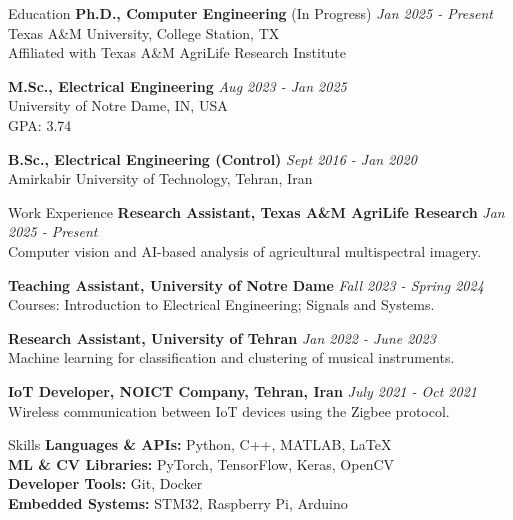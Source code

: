 \documentclass{resume} %
\begin{document}
\begin{rSection}{Education}
{\bf Ph.D., Computer Engineering} (In Progress) \hfill {\em Jan 2025 - Present}\\
Texas A\&M University, College Station, TX\\
Affiliated with Texas A\&M AgriLife Research Institute

{\bf M.Sc., Electrical Engineering} \hfill {\em Aug 2023 - Jan 2025}\\
University of Notre Dame, IN, USA\\
GPA: 3.74

{\bf B.Sc., Electrical Engineering (Control)} \hfill {\em Sept 2016 - Jan 2020}\\
Amirkabir University of Technology, Tehran, Iran
\end{rSection}

\begin{rSection}{Work Experience}
{\bf Research Assistant, Texas A\&M AgriLife Research} \hfill {\em Jan 2025 - Present}\\
Computer vision and AI-based analysis of agricultural multispectral imagery.

{\bf Teaching Assistant, University of Notre Dame} \hfill {\em Fall 2023 - Spring 2024}\\
Courses: Introduction to Electrical Engineering; Signals and Systems.

{\bf Research Assistant, University of Tehran} \hfill {\em Jan 2022 - June 2023}\\
Machine learning for classification and clustering of musical instruments.

{\bf IoT Developer, NOICT Company, Tehran, Iran} \hfill {\em July 2021 - Oct 2021}\\
Wireless communication between IoT devices using the Zigbee protocol.
\end{rSection}

\begin{rSection}{Skills}
{\bf Languages \& APIs:} Python, C++, MATLAB, LaTeX\\
{\bf ML \& CV Libraries:} PyTorch, TensorFlow, Keras, OpenCV\\
{\bf Developer Tools:} Git, Docker\\
{\bf Embedded Systems:} STM32, Raspberry Pi, Arduino
\end{rSection}
\end{document}

